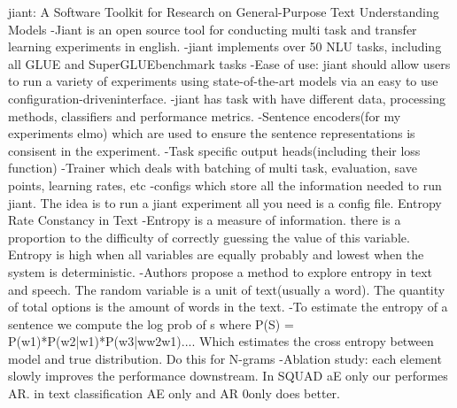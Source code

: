 jiant: A Software Toolkit for Research on General-Purpose Text Understanding Models
-Jiant is an open source tool for conducting multi task and transfer learning experiments in english. 
-jiant implements over 50 NLU tasks, including all GLUE and SuperGLUEbenchmark tasks
-Ease of use: jiant should allow users to run a variety of experiments using state-of-the-art models via an easy to use configuration-driveninterface. 
-jiant has task with have different data, processing methods, classifiers and performance metrics.
-Sentence encoders(for my experiments elmo) which are used to ensure the sentence representations is consisent in the experiment.
-Task specific output heads(including their loss function)
-Trainer which deals with batching of multi task, evaluation, save points, learning rates, etc
-configs which store all the information needed to run jiant. The idea is to run a jiant experiment all you need is a config file.
Entropy Rate Constancy in Text
-Entropy is a measure of information. there is a proportion to the difficulty of correctly guessing the value of this variable. Entropy is high when all variables are equally probably and lowest when the system is deterministic. 
-Authors propose a method to explore entropy in text and speech. The random variable is a unit of text(usually a word). The quantity of total options is the amount of words in the text. 
-To estimate the entropy of a sentence we compute the log prob of s where P(S) = P(w1)*P(w2|w1)*P(w3|ww2w1).... Which estimates the cross entropy between model and true distribution. Do this for N-grams
-Ablation study: each element slowly improves the performance downstream. In SQUAD aE only our performes AR. in text classification AE only and AR 0only does better. 
\fi